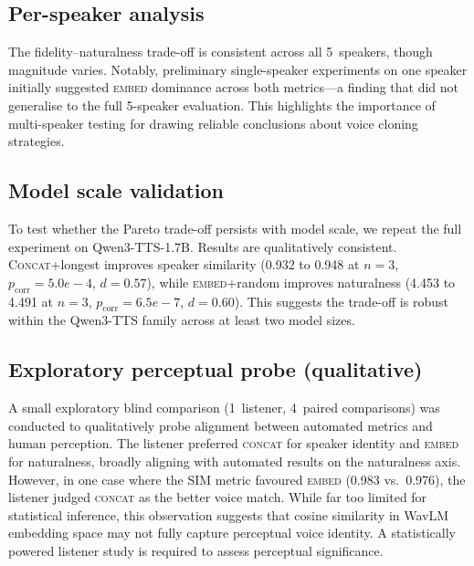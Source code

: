 \documentclass{Interspeech}
\begin{document}
\subsection{Per-speaker analysis}
\label{sec:perspeaker}

The fidelity--naturalness trade-off is consistent across all 5~speakers, though magnitude varies.
Notably, preliminary single-speaker experiments on one speaker initially suggested \textsc{embed} dominance across both metrics---a finding that did not generalise to the full 5-speaker evaluation.
This highlights the importance of multi-speaker testing for drawing reliable conclusions about voice cloning strategies.

\subsection{Model scale validation}
\label{sec:scale}

To test whether the Pareto trade-off persists with model scale, we repeat the full experiment on Qwen3-TTS-1.7B.
Results are qualitatively consistent.
\textsc{Concat}+longest improves speaker similarity (0.932 to 0.948 at $n{=}3$, $p_\text{corr}{=}5.0e-4$, $d{=}0.57$), while \textsc{embed}+random improves naturalness (4.453 to 4.491 at $n{=}3$, $p_\text{corr}{=}6.5e-7$, $d{=}0.60$).
This suggests the trade-off is robust within the Qwen3-TTS family across at least two model sizes.

\subsection{Exploratory perceptual probe (qualitative)}
\label{sec:perceptual}

A small exploratory blind comparison (1~listener, 4~paired comparisons) was conducted to qualitatively probe alignment between automated metrics and human perception.
The listener preferred \textsc{concat} for speaker identity and \textsc{embed} for naturalness, broadly aligning with automated results on the naturalness axis.
However, in one case where the SIM metric favoured \textsc{embed} (0.983 vs.\ 0.976), the listener judged \textsc{concat} as the better voice match.
While far too limited for statistical inference, this observation suggests that cosine similarity in WavLM embedding space may not fully capture perceptual voice identity.
A statistically powered listener study is required to assess perceptual significance.

\end{document}
